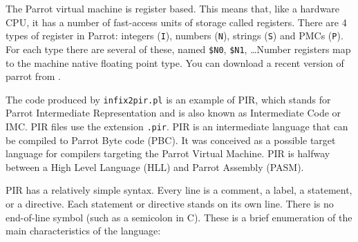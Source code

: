 The Parrot virtual machine is register based. This means that, like a hardware
CPU, it has a number of fast-access units of storage called registers.
There are 4 types of register in Parrot: integers (\verb|I|), numbers (\verb|N|),
strings (\verb|S|) and PMCs (\verb|P|). For each type there are several of these, named
\verb|$N0|, \verb|$N1|, \ldots  Number registers map
to the machine native floating point type. 
You can download a recent version of parrot from
.

The code produced by \verb|infix2pir.pl| is an example of PIR, which stands for 
Parrot Intermediate Representation and is also known as
Intermediate Code or IMC. PIR files use the extension \verb|.pir|.
PIR is an intermediate language that can be compiled to
Parrot Byte code (PBC). It was conceived as a possible target language for compilers
targeting the Parrot Virtual Machine. PIR is halfway between a High
Level Language (HLL) and Parrot Assembly (PASM).

PIR has a relatively simple syntax. Every line is a comment, a
label, a statement, or a directive. Each statement or directive
stands on its own line. There is no end-of-line symbol (such as a
semicolon in C). These is a brief enumeration of the main characteristics of the language:

